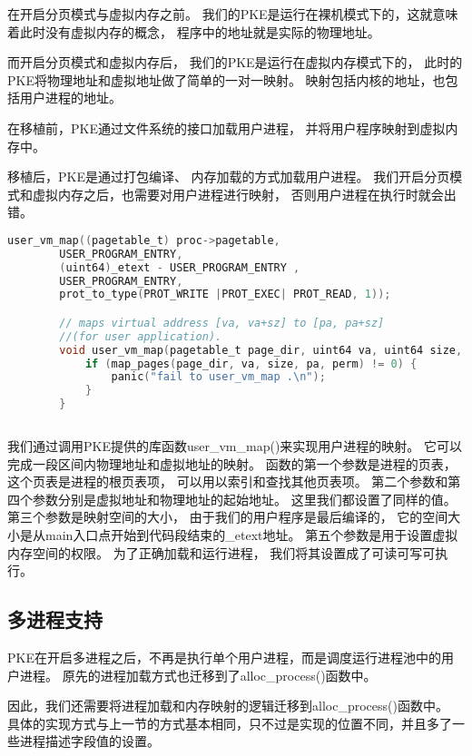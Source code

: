 在开启分页模式与虚拟内存之前。
我们的PKE是运行在裸机模式下的，这就意味着此时没有虚拟内存的概念，
程序中的地址就是实际的物理地址。

而开启分页模式和虚拟内存后，
我们的PKE是运行在虚拟内存模式下的，
此时的PKE将物理地址和虚拟地址做了简单的一对一映射。
映射包括内核的地址，也包括用户进程的地址。

在移植前，PKE通过文件系统的接口加载用户进程，
并将用户程序映射到虚拟内存中。

移植后，PKE是通过打包编译、
内存加载的方式加载用户进程。
我们开启分页模式和虚拟内存之后，也需要对用户进程进行映射，
否则用户进程在执行时就会出错。

\begin{lstlisting}[caption={用户进程地址映射}, label={lst:user_process_map}, language=C]
    user_vm_map((pagetable_t) proc->pagetable,
        USER_PROGRAM_ENTRY, 
        (uint64)_etext - USER_PROGRAM_ENTRY ,
        USER_PROGRAM_ENTRY,
        prot_to_type(PROT_WRITE |PROT_EXEC| PROT_READ, 1)); 

        // maps virtual address [va, va+sz] to [pa, pa+sz] 
        //(for user application).
        void user_vm_map(pagetable_t page_dir, uint64 va, uint64 size, uint64 pa, int perm) {
            if (map_pages(page_dir, va, size, pa, perm) != 0) {
                panic("fail to user_vm_map .\n");
            }
        }
               
\end{lstlisting}

我们通过调用PKE提供的库函数user\_vm\_map()来实现用户进程的映射。
它可以完成一段区间内物理地址和虚拟地址的映射。
函数的第一个参数是进程的页表，这个页表是进程的根页表项，
可以用以索引和查找其他页表项。
第二个参数和第四个参数分别是虚拟地址和物理地址的起始地址。
这里我们都设置了同样的值。
第三个参数是映射空间的大小，
由于我们的用户程序是最后编译的，
它的空间大小是从main入口点开始到代码段结束的\_etext地址。
第五个参数是用于设置虚拟内存空间的权限。
为了正确加载和运行进程，
我们将其设置成了可读可写可执行。


\subsection{多进程支持}

PKE在开启多进程之后，不再是执行单个用户进程，而是调度运行进程池中的用户进程。
原先的进程加载方式也迁移到了alloc\_process()函数中。

因此，我们还需要将进程加载和内存映射的逻辑迁移到alloc\_process()函数中。
具体的实现方式与上一节的方式基本相同，只不过是实现的位置不同，并且多了一些进程描述字段值的设置。

